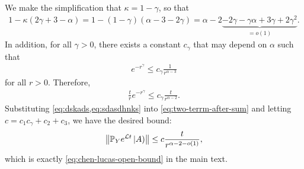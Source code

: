 We make the simplification that $\kappa = 1-\gamma$, so that
\begin{align}
	1-\kappa(2\gamma+3-\alpha) = 1-(1-\gamma)(\alpha-3-2\gamma) = \alpha-2\underbrace{-2\gamma-\gamma\alpha+3\gamma+2\gamma^2}_{=o(1)}. \label{eq:sdasdhnks}
\end{align}
In addition, for all $\gamma>0$, there exists a constant $c_\gamma$ that may depend on $\alpha$ such that
\begin{align}
	e^{-r^{\gamma}} \leq c_\gamma \frac{1}{r^{\alpha-3}}
\end{align}
for all $r>0$.
Therefore,
\begin{align}
	\frac{t}{r} e^{-r^{\gamma}} \leq c_\gamma \frac{t}{r^{\alpha-2}}.\label{eq:dskads}
\end{align}
Substituting \cref{eq:dskads,eq:sdasdhnks} into \cref{eq:two-terrm-after-sum} and letting $c = c_1 c_\gamma + c_2+c_3$, we have the desired bound:
\begin{align}
	\left\|\mathbb{P}_Y e^{\mathcal{L} t} \left | A \right)\right\| \le c \frac{t}{r^{\alpha-2-o(1)}},
\end{align}
which is exactly \cref{eq:chen-lucas-open-bound} in the main text.
